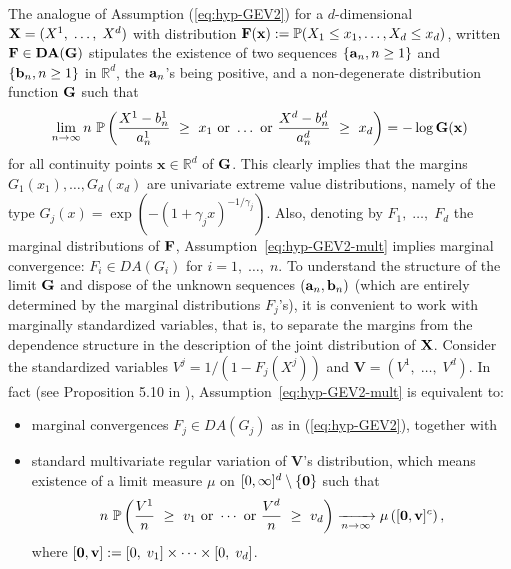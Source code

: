 The analogue of Assumption (\ref{eq:hyp-GEV2}) for a $d$-dimensional \rv~$\mathbf X = (X^1,\; \ldots, \; X^d)$ with distribution $\mathbf F(\mathbf x):=\mathbb{P}(X_1 \le x_1, \ldots, X_d \le x_d)$, written $\mathbf F \in \textbf{DA} (\mathbf G)$ stipulates the existence of two sequences $\{\mathbf a_n, n \ge 1\}$ and $\{\mathbf b_n, n \ge 1\}$ in $\mathbb{R}^d$, the $\mathbf a_n$'s being positive,
and a non-degenerate distribution function $\mathbf G$ such that
\begin{align}
\label{eq:hyp-GEV2-mult}%
\lim_{n \to \infty} n ~\mathbb{P}\left( \frac{X^1 - b_n^1}{a_n^1} ~\ge~ x_1 \text{~or~} \ldots \text{~or~} \frac{X^d - b_n^d}{a_n^d} ~\ge~ x_d \right) = -\log \mb G(\mathbf{x})
\end{align}
for all continuity points $\mathbf{x} \in \mathbb{R}^d$ of $\mathbf G$. This clearly implies
that the margins $G_1(x_1),\ldots,G_d(x_d)$ are univariate extreme
value distributions, namely of the type $G_j(x) = \exp(-(1 + \gamma_j
x)^{-1/\gamma_j})$. Also, denoting by $F_1,\; \ldots,\; F_d$ the
marginal
distributions of $\mathbf F$, Assumption~\eqref{eq:hyp-GEV2-mult} implies marginal convergence: $F_i \in DA(G_i)$ for $i=1,\; \ldots,\; n$.
 To understand %
the structure of the limit $\mathbf G$ and dispose of the
 unknown sequences $(\mathbf a_n, \mathbf b_n)$ (which are entirely determined by the
 marginal distributions $F_j$'s), %
 it is convenient to
 work with marginally standardized variables, that is, to separate the margins from the dependence structure in the description of the joint distribution of $\mathbf X$. Consider the standardized variables 
 $V^j =1/(1-F_j(X^j))$ and $\mathbf{V}=(V^1,\; \ldots,\; V^d)$.  In
 fact (see Proposition 5.10 in \cite{Resnick1987}), Assumption~\eqref{eq:hyp-GEV2-mult} is
 equivalent to:

\begin{itemize}
\item  marginal convergences $F_j \in DA(G_j)$ as in (\ref{eq:hyp-GEV2}),  %
 together with 
\item standard  multivariate regular variation of $\mathbf{V}$'s
 distribution,  which means existence of a limit measure $\mu$  on $ [0,\infty]^d\setminus\{\mathbf 0\}$ such that %
\begin{align}
\label{back:intro:regvar}
 n~ \mathbb{P}\left( \frac{V^1 }{n} ~\ge~ v_1 \text{~or~} \cdots
   \text{~or~} \frac{V^d }{n} ~\ge~ v_d \right) \xrightarrow[n\to\infty]{}\mu \left([\mathbf 0,\mathbf v]^c\right),
\end{align}
where $[\mathbf 0,\mathbf{v}]:=[0,\; v_1]\times \cdots \times
[0,\; v_d]$.
\end{itemize}


